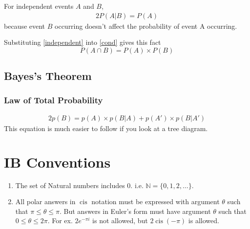 \documentclass[letterpaper, 12pt]{report}
\DeclareMathOperator\cis{cis}
\theoremstyle{definition}
\numberwithin{equation}{section}
\begin{document}
For independent events $A$ and $B$,
\begin{alignat}{2}{}
	P(A|B) = P(A)
	\label{independent}
\end{alignat}
because event $B$ occurring doesn't affect the probability of event A occurring.

Substituting \eqref{independent} into \eqref{cond} gives this fact
\begin{equation}
	P(A \cap B) = P(A) \times P(B)
\end{equation}

\subsection{Bayes's Theorem}
\subsubsection{Law of Total Probability}
\begin{alignat*}{2}{}
	p(B) = p(A) \times p(B|A) + p(A') \times p(B|A')
\end{alignat*}
This equation is much easier to follow if you look at a tree diagram.
\section{IB Conventions}
\begin{enumerate}
	\item The set of Natural numbers includes 0. i.e. $\mathbb{N} = \{0,1,2,\dots\}$.
	\item All polar answers in $\cis$ notation must be expressed with argument $\theta$ such that $\pi\le\theta\le\pi$. But answers in Euler's form must have argument $\theta$ such that $0 \le \theta \le 2 \pi$. For ex. $2e^{-\pi i}$ is not allowed, but $2\cis(-\pi)$ is allowed.
\end{enumerate}
\end{document}
